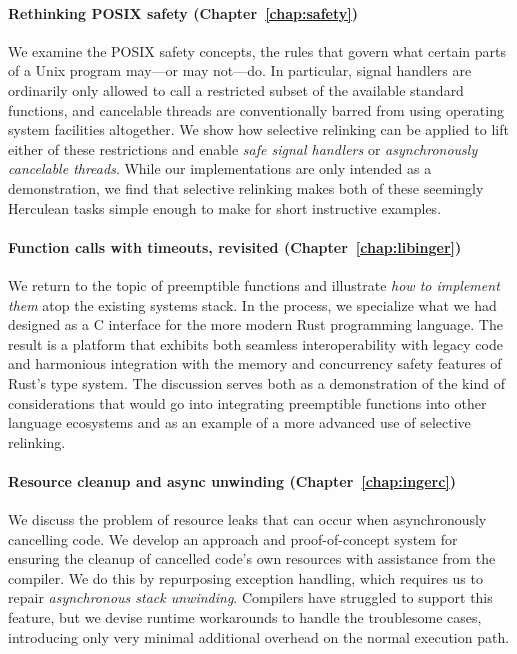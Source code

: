\paragraph{Rethinking POSIX safety (Chapter~\ref{chap:safety})}
We examine the POSIX safety concepts, the rules that govern what certain parts of a
Unix program may---or may not---do.  In particular, signal handlers are ordinarily
only allowed to call a restricted subset of the available standard functions, and
cancelable threads are conventionally barred from using operating system facilities
altogether.  We show how selective relinking can be applied to lift either of these
restrictions and enable \textit{safe signal handlers} or \textit{asynchronously
cancelable threads}.  While our implementations are only intended as a
demonstration, we find that selective relinking makes both of these seemingly
Herculean tasks simple enough to make for short instructive examples.

\paragraph{Function calls with timeouts, revisited (Chapter~\ref{chap:libinger})}
We return to the topic of preemptible functions and illustrate \textit{how to
implement them}
atop the existing systems stack.  In the process, we specialize what we had designed
as a C interface for the more modern Rust programming language.  The result is a
platform that exhibits both seamless interoperability with legacy code and harmonious
integration with the memory and concurrency safety features of Rust's type system.
The discussion serves both as a demonstration of the kind of considerations that
would go into integrating preemptible functions into other language ecosystems and as
an example of a more advanced use of selective relinking.

\paragraph{Resource cleanup and async unwinding (Chapter~\ref{chap:ingerc})}
We discuss the problem of resource leaks that can occur when asynchronously
cancelling code.  We develop an approach and proof-of-concept system for ensuring the
cleanup of cancelled code's own resources with assistance from the compiler.  We do
this by repurposing exception handling, which requires us to repair
\textit{asynchronous stack unwinding}.  Compilers have struggled to support this
feature, but we devise runtime workarounds to handle the troublesome cases,
introducing only very minimal additional overhead on the normal execution path.

